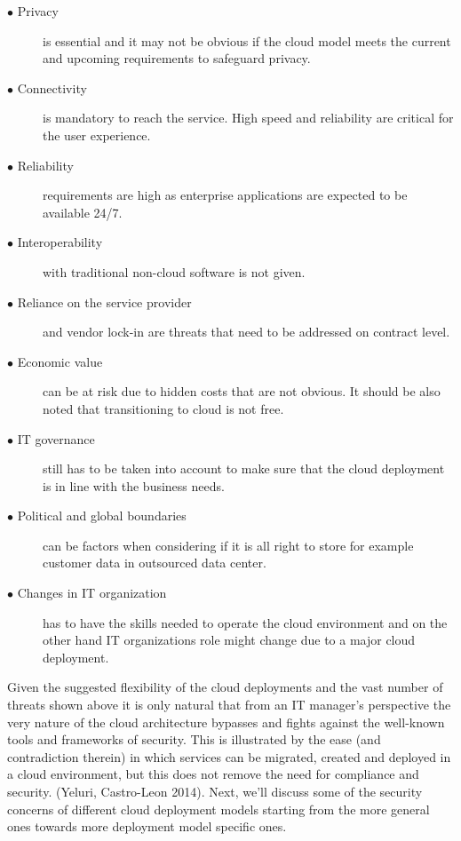 \documentclass{article}
\begin{document}
\begin{description}
        \item[$\bullet$ Privacy] is essential and it may not be obvious if the cloud model meets the current and upcoming requirements to safeguard privacy.
        \item[$\bullet$ Connectivity] is mandatory to reach the service. High speed and reliability are critical for the user experience.
        \item[$\bullet$ Reliability] requirements are high as enterprise applications are expected to be available 24/7.
        \item[$\bullet$ Interoperability] with traditional non-cloud software is not given.
        \item[$\bullet$ Reliance on the service provider] and vendor lock-in are threats that need to be addressed on contract level.
        \item[$\bullet$ Economic value] can be at risk due to hidden costs that are not obvious. It should be also noted that transitioning to cloud is not free.
        \item[$\bullet$ IT governance] still has to be taken into account to make sure that the cloud deployment is in line with the business needs.
        \item[$\bullet$ Political and global boundaries] can be factors when considering if it is all right to store for example customer data in outsourced data center.
        \item[$\bullet$ Changes in IT organization] has to have the skills needed to operate the cloud environment and on the other hand IT organizations role might change due to a major cloud deployment.
\end{description}
Given the suggested flexibility of the cloud deployments and the vast number of threats shown above it is only natural that from an IT manager's perspective the very nature of the cloud architecture bypasses and fights against the well-known tools and frameworks of security.
This is illustrated by the ease (and contradiction therein) in which services can be migrated, created and deployed in a cloud environment, but this does not remove the need for compliance and security. (Yeluri, Castro-Leon 2014). 
Next, we'll discuss some of the security concerns of different cloud deployment models starting from the more general ones towards more deployment model specific ones.
\end{document}
